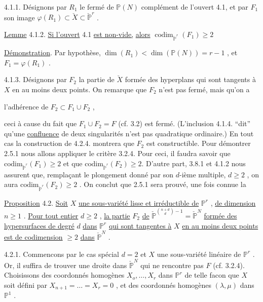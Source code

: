 4.1.1. Désignons par $R_1$ le fermé de $\mathbb{P}(N)$ complément de l'ouvert 4.1, et par $F_1$ son image $\varphi(R_1) \subset \check{X} \subset \check{\mathbb{P}}^r$ .

\underline{Lemme} 4.1.2. \underline{Si l'ouvert} 4.1 \underline{est non-vide,} \underline{alors} $\operatorname{codim}_{\check{\mathbb{P}}^r}(F_1) \geqslant 2$

\underline{Démonstration}. Par hypothèse, $\dim(R_1) < \dim(\mathbb{P}(N)) = r-1$ , et $F_1 = \varphi(R_1)$ .

4.1.3. Désignons par $F_2$ la partie de $\check{X}$ formée des hyperplans qui sont tangents à $X$ en au moins deux points. On remarque que $F_2$ n'est
pas fermé, mais qu'on a

l'adhérence de $F_2 \subset F_1 \cup F_2$ ,

ceci à cause du fait que $F_1 \cup F_2 = F$ (cf. 3.2) est fermé. (L'inclusion 4.1.4. ``dit'' qu'une \underline{confluence} de deux singularités n'est pas quadratique ordinaire.) En tout cas la construction de 4.2.4. montrera que $F_2$ est constructible. Pour démontrer 2.5.1 nous allons appliquer le critère 3.2.4. Pour ceci, il faudra savoir que $\mathrm{codim}_{\check{\mathbb{P}}^r}(F_1) \geq 2$ et que $\mathrm{codim}_{\check{\mathbb{P}}^r}(F_2) \geq 2$. D'autre part, 3.8.1 et 4.1.2 nous assurent que, remplaçant le plongement donné par son $d$-ième multiple, $d \geq 2$ , on aura $\mathrm{codim}_{\check{\mathbb{P}}^r}(F_2) \geq 2$ . On conclut que 2.5.1 sera prouvé, une fois connue la

\underline{Proposition} 4.2. \underline{Soit} $X$ \underline{une sous-variété lisse et irréductible de} $\mathbb{P}^r$ , \underline{de dimension} $n \geq 1$ . \underline{Pour tout entier} $d \geq 2$ , \underline{la partie} $F_2$ \underline{de} $\check{\mathbb{P}}^{{n+d \choose d}-1} = \check{\mathbb{P}}^N$ \underline{formée des hypersurfaces de degré} $d$ \underline{dans} $\mathbb{P}^r$ \underline{qui sont tangentes à} $X$ \underline{en au moins deux points est de codimension} $\geq 2$ \underline{dans} $\check{\mathbb{P}}^N$ .

4.2.1. Commencons par le cas spécial $d = 2$ et $X$ une sous-variété linéaire de $\mathbb{P}^r$ . Or, il suffira de trouver une droite dans $\check{\mathbb{P}}^N$ qui ne rencontre pas $F$ (cf. 3.2.4). Choisissons des coordonnés homogènes $X_o,\ldots,X_r$ dans $\mathbb{P}^r$ de telle facon que $X$ soit défini par
$X_{n+1} = \ldots = X_r = 0$ , et des coordonnés homogènes $(\lambda, \mu)$ dans $\mathbb{P}^1$ .

